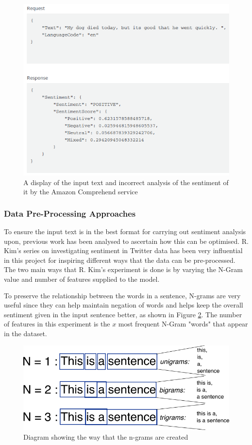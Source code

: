 \begin{figure}[ht]
\centering
\includegraphics[scale=0.6]{litImgs/comphrendResult.png}
\caption{A display of the input text and incorrect analysis of the sentiment of it by the Amazon Comprehend service}
\label{aws:sentiment}
\end{figure}

\subsubsection{Data Pre-Processing Approaches}

To ensure the input text is in the best format for carrying out sentiment analysis upon, previous work has been analysed to ascertain how this can be optimised.
R. Kim's series on investigating sentiment in Twitter data \cite{towardsDS} has been very influential in this project for inspiring different ways that the data can be pre-processed.
The two main ways that R. Kim's experiment is done is by varying the N-Gram value and number of features supplied to the model.

To preserve the relationship between the words in a sentence, N-grams are very useful since they can help maintain negation of words and helps keep the overall sentiment given in the input sentence better, as shown in Figure \ref{ngrams}. The number of features in this experiment is the $x$ most frequent N-Gram "words" that appear in the dataset.

\begin{figure}[h]
\centering
\includegraphics[scale=0.5]{litImgs/ngrams.png}
\caption{Diagram showing the way that the n-grams are created}
\label{ngrams}
\end{figure}

